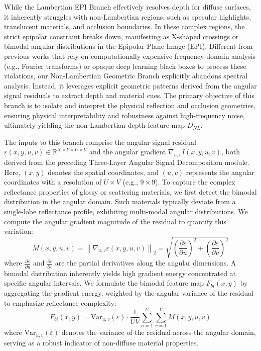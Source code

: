 While the Lambertian EPI Branch effectively resolves depth for diffuse surfaces, it inherently struggles with non-Lambertian regions, such as specular highlights, translucent materials, and occlusion boundaries. In these complex regions, the strict epipolar constraint breaks down, manifesting as X-shaped crossings or bimodal angular distributions in the Epipolar Plane Image (EPI). Different from previous works that rely on computationally expensive frequency-domain analysis (e.g., Fourier transforms) or opaque deep learning black boxes to process these violations, our Non-Lambertian Geometric Branch explicitly abandons spectral analysis. Instead, it leverages explicit geometric patterns derived from the angular signal residuals to extract depth and material cues. The primary objective of this branch is to isolate and interpret the physical reflection and occlusion geometries, ensuring physical interpretability and robustness against high-frequency noise, ultimately yielding the non-Lambertian depth feature map $D_{NL}$.

The inputs to this branch comprise the angular signal residual $\varepsilon(x, y, u, v) \in \mathbb{R}^{X \times Y \times U \times V}$ and the angular gradient $\nabla_{u,v} I(x, y, u, v)$, both derived from the preceding Three-Layer Angular Signal Decomposition module. Here, $(x,y)$ denotes the spatial coordinates, and $(u,v)$ represents the angular coordinates with a resolution of $U \times V$ (e.g., $9 \times 9$). To capture the complex reflectance properties of glossy or scattering materials, we first detect the bimodal distribution in the angular domain. Such materials typically deviate from a single-lobe reflectance profile, exhibiting multi-modal angular distributions. We compute the angular gradient magnitude of the residual to quantify this variation:
\begin{equation}
\label{eq:eq12}
M(x,y,u,v) = \left\| \nabla_{u,v} \varepsilon(x,y,u,v) \right\|_2 = \sqrt{ \left( \frac{\partial \varepsilon}{\partial u} \right)^2 + \left( \frac{\partial \varepsilon}{\partial v} \right)^2 }
\end{equation}
where $\frac{\partial \varepsilon}{\partial u}$ and $\frac{\partial \varepsilon}{\partial v}$ are the partial derivatives along the angular dimensions. A bimodal distribution inherently yields high gradient energy concentrated at specific angular intervals. We formulate the bimodal feature map $F_{bi}(x,y)$ by aggregating the gradient energy, weighted by the angular variance of the residual to emphasize reflectance complexity:
\begin{equation}
\label{eq:eq13}
F_{bi}(x,y) = \text{Var}_{u,v}(\varepsilon) \cdot \frac{1}{UV} \sum_{u=1}^{U} \sum_{v=1}^{V} M(x,y,u,v)
\end{equation}
where $\text{Var}_{u,v}(\varepsilon)$ denotes the variance of the residual across the angular domain, serving as a robust indicator of non-diffuse material properties.

